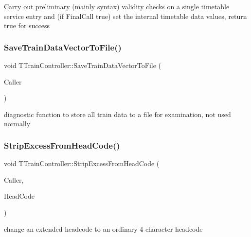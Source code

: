 Carry out preliminary (mainly syntax) validity checks on a single timetable service entry and (if Final\+Call true) set the internal timetable data values, return true for success \mbox{\label{class_t_train_controller_a6161618bda2a677f797eda9a9deeb9fa}} 
\subsubsection{\texorpdfstring{Save\+Train\+Data\+Vector\+To\+File()}{SaveTrainDataVectorToFile()}}
{\footnotesize\ttfamily void T\+Train\+Controller\+::\+Save\+Train\+Data\+Vector\+To\+File (\begin{DoxyParamCaption}\item[{int}]{Caller }\end{DoxyParamCaption})}

diagnostic function to store all train data to a file for examination, not used normally \mbox{\label{class_t_train_controller_ac47f05f3d0baaf235c430b631c6fd1ad}} 
\subsubsection{\texorpdfstring{Strip\+Excess\+From\+Head\+Code()}{StripExcessFromHeadCode()}}
{\footnotesize\ttfamily void T\+Train\+Controller\+::\+Strip\+Excess\+From\+Head\+Code (\begin{DoxyParamCaption}\item[{int}]{Caller,  }\item[{Ansi\+String \&}]{Head\+Code }\end{DoxyParamCaption})}

change an extended headcode to an ordinary 4 character headcode \mbox{\label{class_t_train_controller_ab0481dd8db0f3f99811f2cdc5b5dfd32}} 
